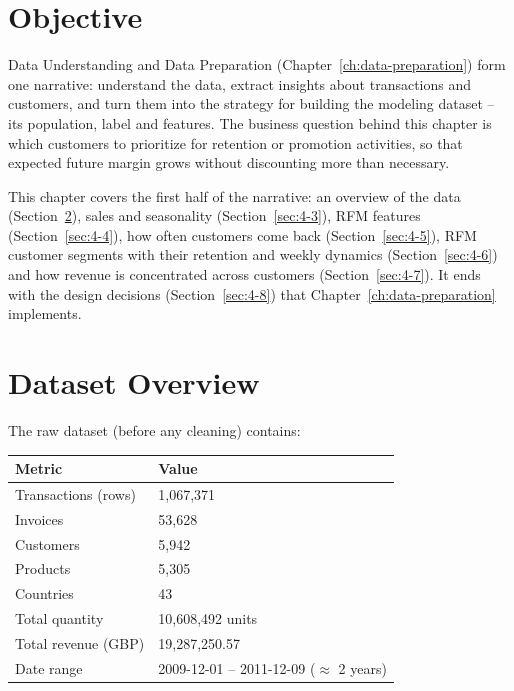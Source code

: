\section{Objective}
\label{sec:4-1}

Data Understanding and Data Preparation (Chapter~\ref{ch:data-preparation}) form one narrative: understand the data, extract insights about transactions and customers, and turn them into the strategy for building the modeling dataset -- its population, label and features. The business question behind this chapter is which customers to prioritize for retention or promotion activities, so that expected future margin grows without discounting more than necessary.

This chapter covers the first half of the narrative: an overview of the data (Section~\ref{sec:4-2}), sales and seasonality (Section~\ref{sec:4-3}), RFM features (Section~\ref{sec:4-4}), how often customers come back (Section~\ref{sec:4-5}), RFM customer segments with their retention and weekly dynamics (Section~\ref{sec:4-6}) and how revenue is concentrated across customers (Section~\ref{sec:4-7}). It ends with the design decisions (Section~\ref{sec:4-8}) that Chapter~\ref{ch:data-preparation} implements.

\section{Dataset Overview}
\label{sec:4-2}

The raw dataset (before any cleaning) contains:

\begin{center}
\begin{tabular}{@{}p{5cm}p{8.5cm}@{}}
    \toprule
    Metric & Value \\
    \midrule
    Transactions (rows) & 1,067,371 \\
    Invoices & 53,628 \\
    Customers & 5,942 \\
    Products & 5,305 \\
    Countries & 43 \\
    Total quantity & 10,608,492 units \\
    Total revenue (GBP) & 19,287,250.57 \\
    Date range & 2009-12-01 -- 2011-12-09 ($\approx$ 2 years) \\
    \bottomrule
\end{tabular}
\end{center}

